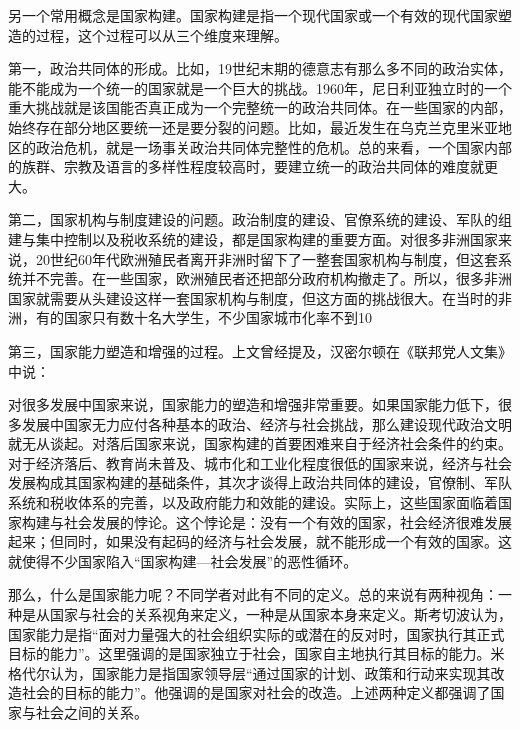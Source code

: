 另一个常用概念是国家构建。国家构建是指一个现代国家或一个有效的现代国家塑造的过程，这个过程可以从三个维度来理解。

第一，政治共同体的形成。比如，19世纪末期的德意志有那么多不同的政治实体，能不能成为一个统一的国家就是一个巨大的挑战。1960年，尼日利亚独立时的一个重大挑战就是该国能否真正成为一个完整统一的政治共同体。在一些国家的内部，始终存在部分地区要统一还是要分裂的问题。比如，最近发生在乌克兰克里米亚地区的政治危机，就是一场事关政治共同体完整性的危机。总的来看，一个国家内部的族群、宗教及语言的多样性程度较高时，要建立统一的政治共同体的难度就更大。

第二，国家机构与制度建设的问题。政治制度的建设、官僚系统的建设、军队的组建与集中控制以及税收系统的建设，都是国家构建的重要方面。对很多非洲国家来说，20世纪60年代欧洲殖民者离开非洲时留下了一整套国家机构与制度，但这套系统并不完善。在一些国家，欧洲殖民者还把部分政府机构撤走了。所以，很多非洲国家就需要从头建设这样一套国家机构与制度，但这方面的挑战很大。在当时的非洲，有的国家只有数十名大学生，不少国家城市化率不到10%

第三，国家能力塑造和增强的过程。上文曾经提及，汉密尔顿在《联邦党人文集》中说：


对很多发展中国家来说，国家能力的塑造和增强非常重要。如果国家能力低下，很多发展中国家无力应付各种基本的政治、经济与社会挑战，那么建设现代政治文明就无从谈起。对落后国家来说，国家构建的首要困难来自于经济社会条件的约束。对于经济落后、教育尚未普及、城市化和工业化程度很低的国家来说，经济与社会发展构成其国家构建的基础条件，其次才谈得上政治共同体的建设，官僚制、军队系统和税收体系的完善，以及政府能力和效能的建设。实际上，这些国家面临着国家构建与社会发展的悖论。这个悖论是：没有一个有效的国家，社会经济很难发展起来；但同时，如果没有起码的经济与社会发展，就不能形成一个有效的国家。这就使得不少国家陷入“国家构建—社会发展”的恶性循环。

那么，什么是国家能力呢？不同学者对此有不同的定义。总的来说有两种视角：一种是从国家与社会的关系视角来定义，一种是从国家本身来定义。斯考切波认为，国家能力是指“面对力量强大的社会组织实际的或潜在的反对时，国家执行其正式目标的能力”。这里强调的是国家独立于社会，国家自主地执行其目标的能力。米格代尔认为，国家能力是指国家领导层“通过国家的计划、政策和行动来实现其改造社会的目标的能力”。他强调的是国家对社会的改造。上述两种定义都强调了国家与社会之间的关系。

